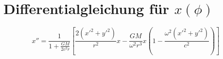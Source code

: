 \section{Differentialgleichung für \(x(\phi)\)}
\[ x'' = \frac{1}{1 + \frac{GM}{2c^2r}} \left[ \frac{2(x'^2 + y'^2)}{r^2}x - \frac{GM}{\omega^2 r^3}x\left(1 - \frac{\omega^2(x'^2 + y'^2)}{c^2}\right) \right] \]
